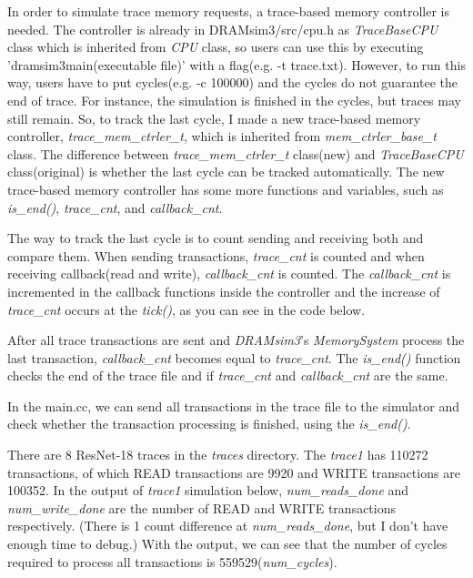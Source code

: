 \documentclass[conference]{IEEEtran}
\begin{document}
In order to simulate trace memory requests, a trace-based memory controller is needed.  
The controller is already in DRAMsim3/src/cpu.h as \emph{TraceBaseCPU} class which is inherited from \emph{CPU} class, so users can use this by executing 'dramsim3main(executable file)' with a flag(e.g. -t trace.txt). 
However, to run this way, users have to put cycles(e.g. -c 100000) and the cycles do not guarantee the end of trace. 
For instance, the simulation is finished in the cycles, but traces may still remain.  
So, to track the last cycle, I made a new trace-based memory controller, \emph{trace\_mem\_ctrler\_t}, which is inherited from \emph{mem\_ctrler\_base\_t} class. 
The difference between \emph{trace\_mem\_ctrler\_t} class(new) and  \emph{TraceBaseCPU} class(original) is whether the last cycle can be tracked automatically. 
The new trace-based memory controller has some more functions and variables, such as \emph{is\_end()}, \emph{trace\_cnt}, and \emph{callback\_cnt}.

The way to track the last cycle is to count sending and receiving both and compare them. 
When sending transactions, \emph{trace\_cnt} is counted and when receiving callback(read and write), \emph{callback\_cnt} is counted.
The \emph{callback\_cnt} is incremented in the callback functions inside the controller and the increase of \emph{trace\_cnt} occurs at the \emph{tick()}, as you can see in the code below.



After all trace transactions are sent and \emph{DRAMsim3}'s \emph{MemorySystem} process the last transaction, \emph{callback\_cnt} becomes equal to \emph{trace\_cnt}. 
The \emph{is\_end()} function checks the end of the trace file and if \emph{trace\_cnt} and \emph{callback\_cnt} are the same. 



In the main.cc, we can send all transactions in the trace file to the simulator and check whether the transaction processing is finished, using the \emph{is\_end()}.   



There are 8 ResNet-18 traces in the \emph{traces} directory.
The \emph{trace1} has 110272 transactions, of which READ transactions are 9920 and WRITE transactions are 100352.
In the output of \emph{trace1} simulation below, \emph{num\_reads\_done} and \emph{num\_write\_done} are the number of READ and WRITE transactions respectively. 
(There is 1 count difference at \emph{num\_reads\_done}, but I don't have enough time to debug.)
With the output, we can see that the number of cycles required to process all transactions is 559529(\emph{num\_cycles}).  
\end{document}

